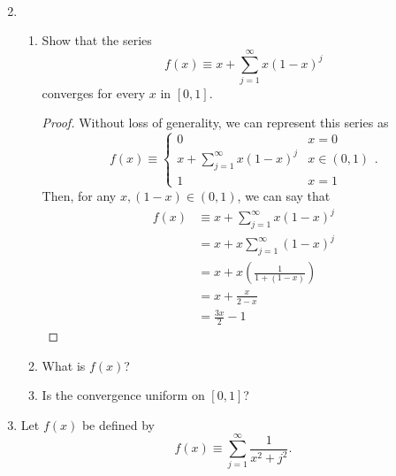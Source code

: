 \documentclass{article}
\begin{document}
\begin{enumerate}
\begin{enumerate}
\begin{align*}
                        \end{align*}
            \end{enumerate}
            \setcounter{enumi}{4}
      \item \begin{enumerate}
                  \item Show that the series
                        \[
                              f(x)\equiv x+\sum_{j=1}^\infty x(1-x)^j
                        \]
                        converges for every $x$ in $[0,1]$.
                        \begin{proof}
                              Without loss of generality, we can represent this series as
                              \[
                                    f(x)\equiv\begin{cases}
                                          0                            & x = 0       \\
                                          x+\sum_{j=1}^\infty x(1-x)^j & x \in (0,1) \\
                                          1                            & x = 1
                                    \end{cases}.
                              \]
                              Then, for any $x, (1-x)\in(0,1)$, we can say that
                              \begin{align*}
                                    f(x) & \equiv x+\sum_{j=1}^\infty x(1-x)^j   \\
                                         & = x + x\sum_{j=1}^\infty (1-x)^j      \\
                                         & = x + x\left(\frac{1}{1+(1-x)}\right) \\
                                         & = x + \frac{x}{2-x}                   \\
                                         & = \frac{3x}{2} - 1
                              \end{align*}
                        \end{proof}
                  \item What is $f(x)$?
                  \item Is the convergence uniform on $[0,1]$?
            \end{enumerate}
            \setcounter{enumi}{6}
      \item Let $f(x)$ be defined by
            \[
                  f(x)\equiv \sum_{j=1}^\infty\frac{1}{x^2+j^2}.
\]
\end{enumerate}
\end{document}
